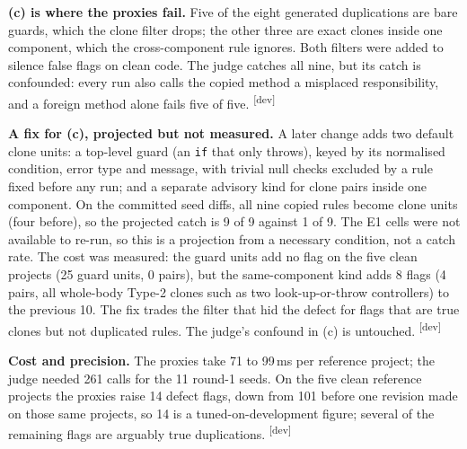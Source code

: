 \documentclass[10pt,a4paper]{article}
\newcommand{\devset}{\textsuperscript{\textsf{\tiny[dev]}}}
\begin{document}
\textbf{(c) is where the proxies fail.} Five of the eight generated duplications are bare guards, which the clone
filter drops; the other three are exact clones inside one component, which the cross-component rule ignores. Both
filters were added to silence false flags on clean code. The judge catches all nine, but its catch is confounded: every
run also calls the copied method a misplaced responsibility, and a foreign method alone fails five of five.
\devset{} %

\textbf{A fix for (c), projected but not measured.} A later change adds two default clone units: a top-level guard
(an \texttt{if} that only throws), keyed by its normalised condition, error type and message, with trivial null
checks excluded by a rule fixed before any run; and a separate advisory kind for clone pairs inside one component.
On the committed seed diffs, all nine copied rules become clone units (four before), so the projected catch is 9 of 9
against 1 of 9. The E1 cells were not available to re-run, so this is a projection from a necessary condition, not a
catch rate. The cost was measured: the guard units add no flag on the five clean projects (25 guard units, 0 pairs),
but the same-component kind adds 8 flags (4 pairs, all whole-body Type-2 clones such as two look-up-or-throw
controllers) to the previous 10. The fix trades the filter that hid the defect for flags that are true clones but not
duplicated rules. The judge's confound in (c) is untouched. \devset{}

\textbf{Cost and precision.} The proxies take 71 to 99\,ms per reference project; the judge needed 261 calls for
the 11 round-1 seeds. On the five clean reference projects the proxies raise 14 defect flags, down from 101 before one
revision made on those same projects, so 14 is a tuned-on-development figure; several of the remaining flags are
arguably true duplications. \devset{}
\end{document}
